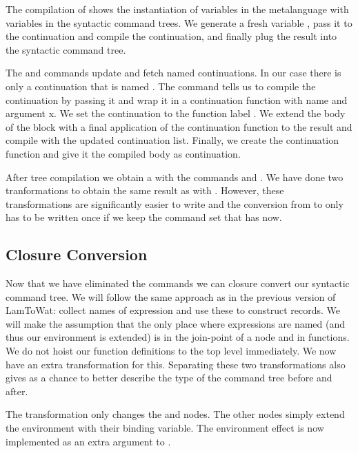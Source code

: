 The compilation of  shows the instantiation of variables in the metalanguage with variables in the syntactic command trees. We generate a fresh variable , pass it to the continuation and compile the continuation, and finally plug the result into the syntactic command tree.

The  and  commands update and fetch named continuations. In our case there is only a continuation that is named . The  command tells us to compile the continuation  by passing it  and wrap it in a continuation function with name  and argument {x}. We set the continuation  to the function label . We extend the body of the block with a final application of the continuation function  to the result  and compile with the updated continuation list. Finally, we create the continuation function and give it the compiled body  as continuation.

After tree compilation we obtain a  with the commands  and . We have done two tranformations to obtain the same result as with . However, these transformations are significantly easier to write and the conversion from  to  only has to be written once if we keep the command set that  has now.

\subsection{\label{subsection:closconvert2}Closure Conversion}
Now that we have eliminated the  commands we can closure convert our syntactic command tree. We will follow the same approach as in the previous version of LamToWat: collect names of expression and use these to construct records. We will make the assumption that the only place where expressions are named (and thus our environment is extended) is in the join-point of a node and in functions. We do not hoist our function definitions to the top level immediately. We now have an extra transformation for this. Separating these two transformations also gives as a chance to better describe the type of the command tree before and after.

The transformation only changes the  and  nodes. The other nodes simply extend the environment with their binding variable. The environment effect is now implemented as an extra argument to .

